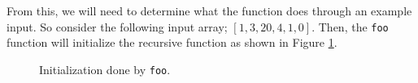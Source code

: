 \documentclass{report}
\begin{document}
From this, we will need to determine what the function does through an example input. So consider the following input array; $[1, 3, 20, 4, 1, 0]$. Then, the \lstinline|foo| function will initialize the recursive function as shown in Figure \ref{p4-1}.
\begin{figure}[h]
	\centering
	\caption{Initialization done by \lstinline|foo|.}
	\label{p4-1}
\end{figure}
\end{document}
